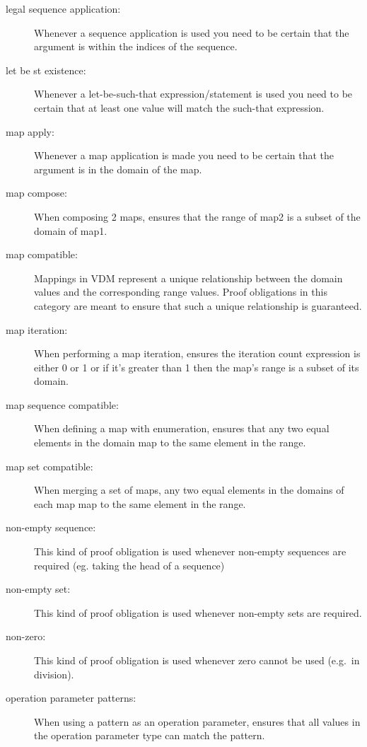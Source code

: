 \begin{description}
\item[legal sequence application:] Whenever a sequence application is used you need to be
  certain that the argument is within the indices of the sequence.

\item[let be st existence:] Whenever a let-be-such-that
  expression/statement is used you need to be certain that at least one value
  will match the such-that expression.

\item[map apply:] Whenever a map application is made you need to be
  certain that the argument is in the domain of the map.

\item[map compose:] When composing 2 maps, ensures that the
range of map2 is a subset of the domain of map1. 

\item[map compatible:] Mappings in VDM represent a unique relationship
  between the domain values and the corresponding range values. Proof
  obligations in this category are meant to ensure that such a unique
  relationship is guaranteed.

\item[map iteration:] When performing a map iteration, ensures the iteration
    count expression is either 0 or 1 or if it's greater than 1 then the map's
    range is a subset of its domain. 

\item[map sequence compatible:] When defining a map with enumeration, ensures that
    any two equal elements in the domain map to the same element in the range.

\item[map set compatible:] When merging a set of maps, any two equal elements in
    the domains of each map map to the same element in the range.

\item[non-empty sequence:] This kind of proof obligation is used whenever
  non-empty sequences are required (eg. taking the head of a sequence)

\item[non-empty set:] This kind of proof obligation is used whenever
  non-empty sets are required.

\item[non-zero:] This kind of proof obligation is used whenever zero
  cannot be used (e.g.\ in division).

\item[operation parameter patterns:] When using a pattern as an operation
    parameter, ensures that all values in the operation parameter type can
    match the pattern.


\end{description}
